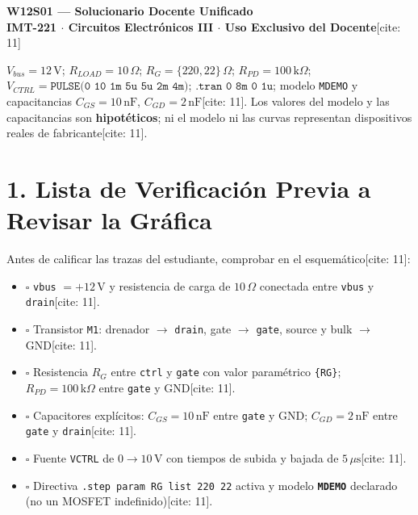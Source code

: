 \documentclass[11pt, a4paper]{article}
\begin{document}
\begin{center}
    {\Large \textbf{W12S01 — Solucionario Docente Unificado}}\\[0.15cm]
    {\large \textbf{IMT-221 $\cdot$ Circuitos Electrónicos III $\cdot$ Uso Exclusivo del Docente}}[cite: 11]
\end{center}

\begin{tcolorbox}[colback=ucbblue!5, colframe=ucbblue, title=\textbf{Configuración Única Auditada}]
    $V_{bus} = 12\,\text{V}$; $R_{LOAD} = 10\,\Omega$; $R_G = \{220, 22\}\,\Omega$; $R_{PD} = 100\,\text{k}\Omega$; $V_{CTRL} = \texttt{PULSE(0 10 1m 5u 5u 2m 4m)}$; $\texttt{.tran 0 8m 0 1u}$; modelo \texttt{MDEMO} y capacitancias $C_{GS} = 10\,\text{nF}$, $C_{GD} = 2\,\text{nF}$[cite: 11]. Los valores del modelo y las capacitancias son \textbf{hipotéticos}; ni el modelo ni las curvas representan dispositivos reales de fabricante[cite: 11].
\end{tcolorbox}

\section*{1. Lista de Verificación Previa a Revisar la Gráfica}
Antes de calificar las trazas del estudiante, comprobar en el esquemático[cite: 11]:
\begin{itemize}[noitemsep]
    \item $\square$ \texttt{vbus} $= +12\,\text{V}$ y resistencia de carga de $10\,\Omega$ conectada entre \texttt{vbus} y \texttt{drain}[cite: 11].
    \item $\square$ Transistor \texttt{M1}: drenador $\to$ \texttt{drain}, gate $\to$ \texttt{gate}, source y bulk $\to$ GND[cite: 11].
    \item $\square$ Resistencia $R_G$ entre \texttt{ctrl} y \texttt{gate} con valor paramétrico \texttt{\{RG\}}; $R_{PD} = 100\,\text{k}\Omega$ entre \texttt{gate} y GND[cite: 11].
    \item $\square$ Capacitores explícitos: $C_{GS} = 10\,\text{nF}$ entre \texttt{gate} y GND; $C_{GD} = 2\,\text{nF}$ entre \texttt{gate} y \texttt{drain}[cite: 11].
    \item $\square$ Fuente \texttt{VCTRL} de $0 \to 10\,\text{V}$ con tiempos de subida y bajada de $5\,\mu\text{s}$[cite: 11].
    \item $\square$ Directiva \texttt{.step param RG list 220 22} activa y modelo \textbf{\texttt{MDEMO}} declarado (no un MOSFET indefinido)[cite: 11].
\end{itemize}
\end{document}
